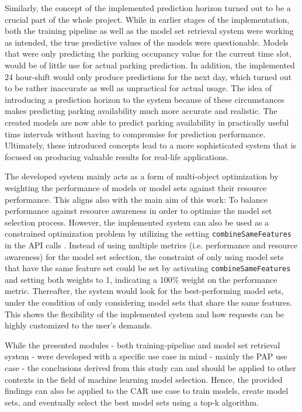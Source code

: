 Similarly, the concept of the implemented prediction horizon turned out to be a crucial part of the whole project. While in earlier stages of the implementation, both the training pipeline as well as the model set retrieval system were working as intended, the true predictive values of the models were questionable. Models that were only predicting the parking occupancy value for the current time slot, would be of little use for actual parking prediction. In addition, the implemented 24 hour-shift would only produce predictions for the next day, which turned out to be rather inaccurate as well as unpractical for actual usage. The idea of introducing a prediction horizon to the system because of these circumstances makes predicting parking availability much more accurate and realistic. The created models are now able to predict parking availability in practically useful time intervals without having to compromise for prediction performance. Ultimately, these introduced concepts lead to a more sophisticated system that is focused on producing valuable results for real-life applications.

The developed system mainly acts as a form of multi-object optimization by weighting the performance of models or model sets against their resource performance. This aligns also with the main aim of this work: To balance performance against resource awareness in order to optimize the model set selection process. However, the implemented system can also be used as a constrained optimization problem by utilizing the setting \texttt{combineSameFeatures} in the API calls \cite{feurer2019}. Instead of using multiple metrics (i.e. performance and resource awareness) for the model set selection, the constraint of only using model sets that have the same feature set could be set by activating \texttt{combineSameFeatures} and setting both weights to 1, indicating a 100\% weight on the performance metric. Thereafter, the system would look for the best-performing model sets, under the condition of only considering model sets that share the same features. This shows the flexibility of the implemented system and how requests can be highly customized to the user's demands.

While the presented modules - both training-pipeline and model set retrieval system - were developed with a specific use case in mind - mainly the PAP use case - the conclusions derived from this study can and should be applied to other contexts in the field of machine learning model selection. Hence, the provided findings can also be applied to the CAR use case to train models, create model sets, and eventually select the best model sets using a top-k algorithm.\\